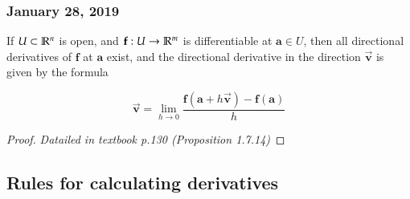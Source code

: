 \subsubsection*{January 28, 2019}

\begin{proposition}
If $U\subset \mathbb{R}^n$ is open, and $\textbf{f}:U\to\mathbb{R}^m$ is differentiable at $\bm{a}\in U$, then all directional derivatives of $\bm{f}$ at $\bm{a}$ exist, and the directional derivative in the direction $\vec{\bm{v}}$ is given by the formula

\begin{equation}
	[\bm{Df} (\bm{a})]\vec{\bm{v}} = \lim_{h\to 0}\frac{\bm{f}(\bm{a}+h\vec{\bm{v}})-\bm{f}(\bm{a})}{h}
\end{equation}
\end{proposition}

\begin{proof}
  \textit{Datailed in textbook p.130 (Proposition 1.7.14)}\end{proof}

\subsection{Rules for calculating derivatives}

